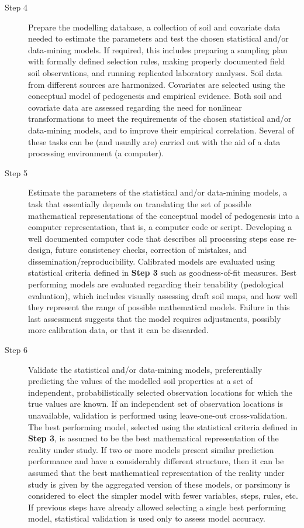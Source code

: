 \begin{description}
\item[Step 4] Prepare the modelling database, a collection of soil and covariate data
needed to estimate the parameters and test the chosen statistical and/or data-mining
models. If required, this includes preparing a sampling plan with formally defined selection rules,
making properly documented field soil observations, and running replicated laboratory analyses.
Soil data from different sources are harmonized. Covariates are selected using the conceptual model
of pedogenesis and empirical evidence. Both soil and covariate data are assessed regarding the need
for nonlinear transformations to meet the requirements of the chosen statistical and/or
data-mining models, and to improve their empirical correlation. Several of these tasks can be (and
usually are) carried out with the aid of a data processing environment (a computer).

\item[Step 5] Estimate the parameters of the statistical and/or data-mining
models, a task that essentially depends on translating the set of possible mathematical
representations of the conceptual model of pedogenesis into a computer representation, that is, a
computer code or script. Developing a well documented computer code that describes all processing
steps ease re-design, future consistency checks, correction of mistakes, and
dissemination/reproducibility. Calibrated models are evaluated using statistical criteria defined in
\textbf{Step 3} such as goodness-of-fit measures. Best performing models are evaluated regarding their
tenability (pedological evaluation), which includes visually assessing draft soil maps, and how well
they represent the range of possible mathematical models. Failure in this last assessment suggests
that the model requires adjustments, possibly more calibration data, or that it can be discarded.

\item[Step 6] Validate the statistical and/or data-mining models, preferentially
predicting the values of the modelled soil properties at a set of independent, probabilistically
selected observation locations for which the true values are known. If an independent set of
observation locations is unavailable, validation is performed using leave-one-out cross-validation.
The best performing model, selected using the statistical criteria defined in \textbf{Step 3}, is
assumed to be the best mathematical representation of the reality under study. If two or more
models present similar prediction performance and have a considerably different structure, then it
can be assumed that the best mathematical representation of the reality under study is given by the
aggregated version of these models, or parsimony is considered to elect the simpler model with 
fewer variables, steps, rules, etc. If previous steps have already allowed selecting a single best
performing model, statistical validation is used only to assess model accuracy.


\end{description}
